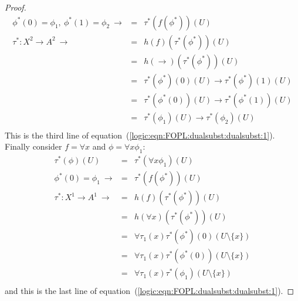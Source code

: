\begin{proof}
\begin{eqnarray*}
    \phi^{*}(0)=\phi_{1},\ \phi^{*}(1)=\phi_{2}\ \rightarrow
    &=&\tau^{*}(f(\phi^{*}))(U)\\
    \tau^{*}:X^{2}\to A^{2}\ \rightarrow
    &=&h(f)(\tau^{*}(\phi^{*}))(U)\\
    &=&h(\to)(\tau^{*}(\phi^{*}))(U)\\
    &=&\tau^{*}(\phi^{*})(0)(U)\to \tau^{*}(\phi^{*})(1)(U)\\
    &=&\tau^{*}(\phi^{*}(0))(U)\to \tau^{*}(\phi^{*}(1))(U)\\
    &=&\tau^{*}(\phi_{1})(U)\to \tau^{*}(\phi_{2})(U)\\
    \end{eqnarray*}
This is the third line of
equation~(\ref{logic:eqn:FOPL:dualsubst:dualsubst:1}). Finally
consider $f=\forall x$ and $\phi=\forall x\phi_{1}$:
    \begin{eqnarray*}
    \tau^{*}(\phi)(U)&=&\tau^{*}(\forall x\phi_{1})(U)\\
    \phi^{*}(0)=\phi_{1}\ \rightarrow
    &=&\tau^{*}(f(\phi^{*}))(U)\\
    \tau^{*}:X^{1}\to A^{1}\ \rightarrow
    &=&h(f)(\tau^{*}(\phi^{*}))(U)\\
    &=&h(\forall x)(\tau^{*}(\phi^{*}))(U)\\
    &=&\forall\tau_{1}(x)\tau^{*}(\phi^{*})(0)(U\setminus\{x\})\\
    &=&\forall\tau_{1}(x)\tau^{*}(\phi^{*}(0))(U\setminus\{x\})\\
    &=&\forall\tau_{1}(x)\tau^{*}(\phi_{1})(U\setminus\{x\})\\
    \end{eqnarray*}
and this is the last line of
equation~(\ref{logic:eqn:FOPL:dualsubst:dualsubst:1}).
\end{proof}
